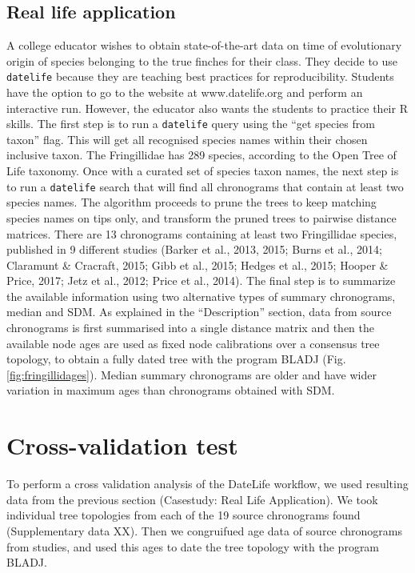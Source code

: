 \documentclass[
  english,
  man]{apa6}
\begin{document}
\hypertarget{real-life-application}{%
\subsection{Real life application}\label{real-life-application}}

A college educator wishes to obtain state-of-the-art data on time of evolutionary origin of species belonging to the true finches for their class. They decide to use \texttt{datelife} because they are teaching best practices for reproducibility.
Students have the option to go to the website at www.datelife.org and perform an interactive run. However, the educator also wants the students to practice their R skills.
The first step is to run a \texttt{datelife} query using the ``get species from taxon'' flag. This will get all recognised species names within their chosen inclusive taxon. The Fringillidae has 289 species, according to the Open Tree of Life taxonomy.
Once with a curated set of species taxon names, the next step is to run a \texttt{datelife} search that will find all chronograms that contain at least two species names. The algorithm proceeds to prune the trees to keep matching species names on tips only, and transform the pruned trees to pairwise distance matrices.
There are 13 chronograms containing at least two Fringillidae species, published in 9 different studies (Barker et al., 2013, 2015; Burns et al., 2014; Claramunt \& Cracraft, 2015; Gibb et al., 2015; Hedges et al., 2015; Hooper \& Price, 2017; Jetz et al., 2012; Price et al., 2014).
The final step is to summarize the available information using two alternative types of summary chronograms, median and SDM. As explained in the ``Description'' section, data from source chronograms is first summarised into a single distance matrix and then the available node ages are used as fixed node calibrations over a consensus tree topology, to obtain a fully dated tree with the program BLADJ (Fig. \ref{fig:fringillidages}). Median summary chronograms are older and have wider variation in maximum ages than chronograms obtained with SDM.

\hypertarget{cross-validation-test}{%
\section{Cross-validation test}\label{cross-validation-test}}

To perform a cross validation analysis of the DateLife workflow, we used resulting data from the previous section (Casestudy: Real Life Application). We took individual tree topologies from each of the 19 source chronograms found (Supplementary data XX). Then we congruifued age data of source chronograms from studies, and used this ages to date the tree topology with the program BLADJ.
\end{document}
